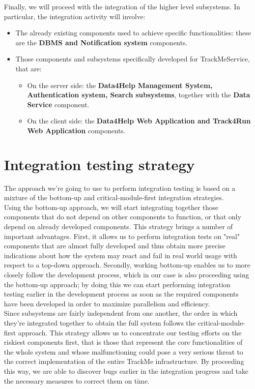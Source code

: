 \documentclass[a4paper, hidelinks, 12pt]{report}
\begin{document}
		Finally, we will proceed with the integration of the higher level subsystems. In particular, the integration activity will involve:
	\begin{itemize}
	\item{} The already existing components used to achieve
specific functionalities: these are the \textbf{DBMS and Notification system} components.
\item{} Those components and subsystems specifically developed for TrackMeService, that are:

	\begin{itemize}
	\item{} On the server side: the \textbf{Data4Help Management System, Authentication system, Search subsystems}, together with the \textbf{Data Service} component.
	\item{} On the client side: the \textbf{Data4Help Web Application and Track4Run Web Application} components.
	\end{itemize}

	\end{itemize}

	\section{Integration testing strategy}
	The approach we're going to use to perform integration testing is based on a mixture of the bottom-up and critical-module-first integration strategies.\\

	Using the bottom-up approach, we will start integrating together those components that do not depend on other components to function, or that only depend on already developed components. This strategy brings a number of important advantages. First, it allows us to perform integration tests on "real" components that are almost fully developed and thus obtain more precise indications about how the system may react and fail in real world usage with respect to a top-down approach. Secondly, working bottom-up enables us to more closely follow the development process, which in our case is also proceeding using the bottom-up approach; by doing this we can start performing integration testing earlier in the development process as soon as the required components have been developed in order to maximize parallelism and efficiency.\\

	Since subsystems are fairly independent from one another, the order in which they're integrated together to obtain the full system follows the critical-module-first approach. This strategy allows us to concentrate our testing efforts on the riskiest components first, that is those that represent the core functionalities of the whole system and whose malfunctioning could pose a very serious threat to the correct implementation of the entire TrackMe infrastructure. By proceeding this way, we are able to discover bugs earlier in the integration progress and take the necessary measures to correct them on time.\\
\end{document}
